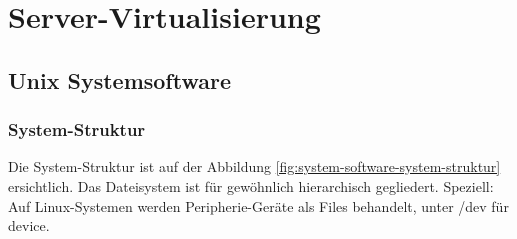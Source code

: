 \chapter{Server-Virtualisierung}

\section{Unix Systemsoftware}

\subsection{System-Struktur}
Die System-Struktur ist auf der Abbildung \ref{fig:system-software-system-struktur} ersichtlich. Das Dateisystem ist für gewöhnlich hierarchisch gegliedert. Speziell: Auf Linux-Systemen werden Peripherie-Geräte als Files behandelt, unter /dev für device.

